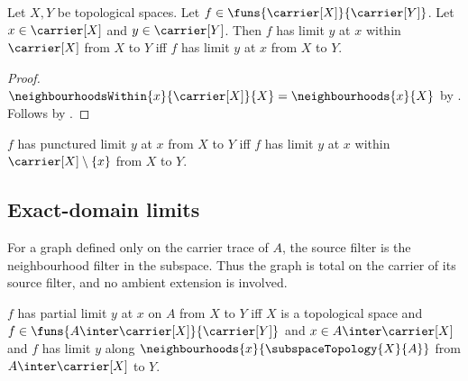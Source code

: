 \begin{theorem}\label{function_limit_within_carrier_iff_limit_at}
    Let $X,Y$ be topological spaces.
    Let $f\in\funs{\carrier[X]}{\carrier[Y]}$.
    Let $x\in\carrier[X]$ and $y\in\carrier[Y]$.
    Then $f$ has limit $y$ at $x$ within $\carrier[X]$ from $X$ to $Y$
        iff $f$ has limit $y$ at $x$ from $X$ to $Y$.
\end{theorem}
\begin{proof}
    $\neighbourhoodsWithin{x}{\carrier[X]}{X}
        =\neighbourhoods{x}{X}$ by
        .
    Follows by
        .
\end{proof}

\begin{definition}\label{function_has_punctured_limit}
    $f$ has punctured limit $y$ at $x$ from $X$ to $Y$ iff
        $f$ has limit $y$ at $x$ within
            $\carrier[X]\setminus\{x\}$ from $X$ to $Y$.
\end{definition}

\subsection{Exact-domain limits}

For a graph defined only on the carrier trace of $A$, the source filter is
the neighbourhood filter in the subspace.  Thus the graph is total on the
carrier of its source filter, and no ambient extension is involved.

\begin{definition}\label{partial_function_has_limit_at}
    $f$ has partial limit $y$ at $x$ on $A$ from $X$ to $Y$ iff
        $X$ is a topological space and
        $f\in\funs{A\inter\carrier[X]}{\carrier[Y]}$ and
        $x\in A\inter\carrier[X]$ and
        $f$ has limit $y$ along
            $\neighbourhoods{x}{\subspaceTopology{X}{A}}$ from
            $A\inter\carrier[X]$ to $Y$.
\end{definition}

